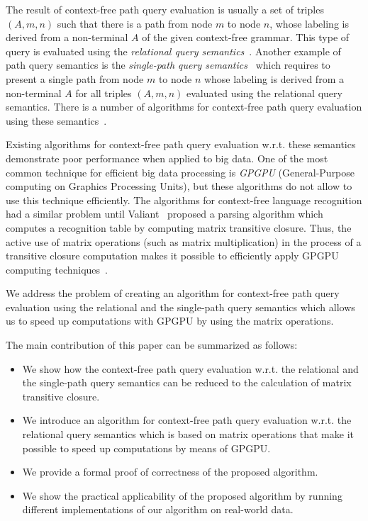 \documentclass[runningheads,a4paper]{llncs}
\begin{document}
The result of context-free path query evaluation is usually a set of triples $(A, m, n)$ such that there is a path from node $m$ to node $n$, whose labeling is derived from a non-terminal $A$ of the given context-free grammar. This type of query is evaluated using the \textit{relational query semantics}~\cite{hellingsRelational}. Another example of path query semantics is the \textit{single-path query semantics}~\cite{hellingsPathQuerying} which requires to present a single path from node $m$ to node $n$ whose labeling is derived from a non-terminal $A$ for all triples $(A, m, n)$ evaluated using the relational query semantics. There is a number of algorithms for context-free path query evaluation using these semantics~\cite{GLL,hellingsRelational,RDF,GraphQueryWithEarley}.

Existing algorithms for context-free path query evaluation w.r.t. these semantics demonstrate poor performance when applied to big data. One of the most common technique for efficient big data processing is \textit{GPGPU} (General-Purpose computing on Graphics Processing Units), but these algorithms do not allow to use this technique efficiently. The algorithms for context-free language recognition had a similar problem until Valiant~\cite{valiant} proposed a parsing algorithm which computes a recognition table by computing matrix transitive closure. Thus, the active use of matrix operations (such as matrix multiplication) in the process of a transitive closure computation makes it possible to efficiently apply GPGPU computing techniques~\cite{matricesOnGPGPU}.

We address the problem of creating an algorithm for context-free path query evaluation using the relational and the single-path query semantics which allows us to speed up computations with GPGPU by using the matrix operations.

The main contribution of this paper can be summarized as follows:
\begin{itemize}
	\item We show how the context-free path query evaluation w.r.t. the relational and the single-path query semantics can be reduced to the calculation of matrix transitive closure.
	\item We introduce an algorithm for context-free path query evaluation w.r.t. the relational query semantics which is based on matrix operations that make it possible to speed up computations by means of GPGPU.
	\item We provide a formal proof of correctness of the proposed algorithm.
	\item We show the practical applicability of the proposed algorithm by running different implementations of our algorithm on real-world data.
\end{itemize}
\end{document}
